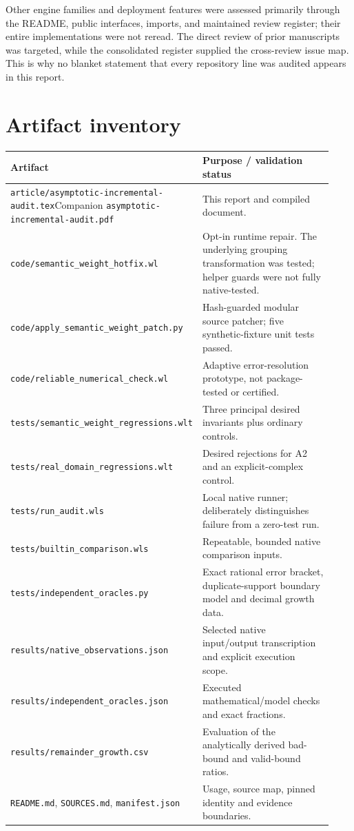 \documentclass[11pt,letterpaper]{article}
\newcommand{\code}[1]{{\small\nolinkurl{#1}}}
\begin{document}
Other engine families and deployment features were assessed primarily through the README, public interfaces, imports, and maintained review register; their entire implementations were not reread. The direct review of prior manuscripts was targeted, while the consolidated register supplied the cross-review issue map. This is why no blanket statement that every repository line was audited appears in this report.

\clearpage
\section{Artifact inventory}
\begin{longtable}{@{}p{0.48\linewidth}p{0.45\linewidth}@{}}
\toprule
Artifact & Purpose / validation status\\\midrule
\endhead
\code{article/asymptotic-incremental-audit.tex}\newline Companion \code{asymptotic-incremental-audit.pdf} & This report and compiled document.\\[4pt]
\code{code/semantic_weight_hotfix.wl} & Opt-in runtime repair. The underlying grouping transformation was tested; helper guards were not fully native-tested.\\[4pt]
\code{code/apply_semantic_weight_patch.py} & Hash-guarded modular source patcher; five synthetic-fixture unit tests passed.\\[4pt]
\code{code/reliable_numerical_check.wl} & Adaptive error-resolution prototype, not package-tested or certified.\\[4pt]
\code{tests/semantic_weight_regressions.wlt} & Three principal desired invariants plus ordinary controls.\\[4pt]
\code{tests/real_domain_regressions.wlt} & Desired rejections for A2 and an explicit-complex control.\\[4pt]
\code{tests/run_audit.wls} & Local native runner; deliberately distinguishes failure from a zero-test run.\\[4pt]
\code{tests/builtin_comparison.wls} & Repeatable, bounded native comparison inputs.\\[4pt]
\code{tests/independent_oracles.py} & Exact rational error bracket, duplicate-support boundary model and decimal growth data.\\[4pt]
\code{results/native_observations.json} & Selected native input/output transcription and explicit execution scope.\\[4pt]
\code{results/independent_oracles.json} & Executed mathematical/model checks and exact fractions.\\[4pt]
\code{results/remainder_growth.csv} & Evaluation of the analytically derived bad-bound and valid-bound ratios.\\[4pt]
\code{README.md}, \code{SOURCES.md}, \code{manifest.json} & Usage, source map, pinned identity and evidence boundaries.\\\bottomrule
\end{longtable}
\end{document}
